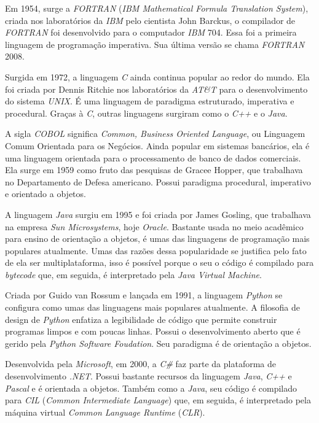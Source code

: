 \documentclass[conference]{IEEEtran}
\begin{document}
Em 1954, surge a \textit{FORTRAN} (\textit{IBM Mathematical Formula Translation System}), criada nos laboratórios da \textit{IBM} pelo cientista John Barckus, o compilador de \textit{FORTRAN} foi desenvolvido para o computador \textit{IBM} 704.  Essa foi a primeira linguagem de programação imperativa. Sua última versão se chama \textit{FORTRAN} 2008.

Surgida em 1972, a linguagem \textit{C} ainda continua popular ao redor do mundo. Ela foi criada por Dennis Ritchie nos laboratórios da \textit{AT\&T} para o desenvolvimento do sistema \textit{UNIX}. É uma linguagem de paradigma estruturado, imperativa e procedural. Graças à \textit{C}, outras linguagens surgiram como o \textit{C++} e o \textit{Java}.

A sigla \textit{COBOL} significa \textit{Common, Business Oriented Language}, ou Linguagem Comum Orientada para os Negócios. Ainda popular em sistemas bancários, ela é uma linguagem orientada para o processamento de banco de dados comerciais. Ela surge em 1959 como fruto das pesquisas de Gracee Hopper, que trabalhava no Departamento de Defesa americano. Possui paradigma procedural, imperativo e orientado a objetos.

A linguagem \textit{Java} surgiu em 1995 e foi criada por James Gosling, que trabalhava na empresa \textit{Sun Microsystems}, hoje \textit{Oracle}. Bastante usada no meio acadêmico para ensino de orientação a objetos, é umas das linguagens de programação mais populares atualmente. Umas das razões dessa popularidade se justifica pelo fato de ela ser multiplataforma, isso é possível porque o seu o código é compilado para \textit{bytecode} que, em seguida, é interpretado pela \textit{Java Virtual Machine}.

Criada por Guido van Rossum e lançada em 1991, a linguagem \textit{Python} se configura como umas das linguagens mais populares atualmente. A filosofia de design de \textit{Python} enfatiza a legibilidade de código que permite construir programas limpos e com poucas linhas. Possui o desenvolvimento aberto que é gerido pela \textit{Python Software Foudation}. Seu paradigma é de orientação a objetos.

Desenvolvida pela \textit{Microsoft}, em 2000, a \textit{C\#} faz parte da plataforma de desenvolvimento \textit{.NET}. Possui bastante recursos da linguagem \textit{Java}, \textit{C++} e \textit{Pascal} e é orientada a objetos. Também como a \textit{Java}, seu código é compilado para \textit{CIL} (\textit{Common Intermediate Language}) que, em seguida,  é interpretado pela máquina virtual \textit{Common Language Runtime} (\textit{CLR}).
\end{document}
